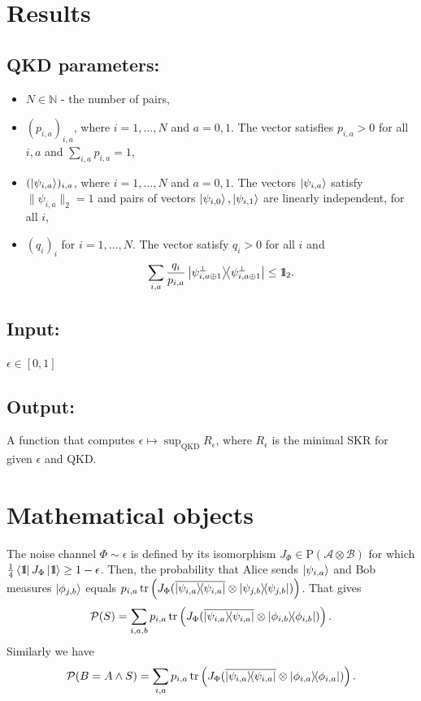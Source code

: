 \documentclass[12pt,a4paper,reqno, aps, superscriptaddress]{amsart}
\newcommand{\Id}{{\rm 1\hspace{-0.9mm}l}}
\newcommand{\PP}{\ensuremath{\mathcal{P}}}
\renewcommand{\AA}{\ensuremath{\mathcal{A}}}
\newcommand{\BB}{\ensuremath{\mathcal{B}}}
\newcommand{\proj}[1]{\ensuremath{\ketbra{#1}{#1}}}
\begin{document}
\section{Results}

\subsection{QKD parameters:}
\begin{itemize}
\item $N \in \mathbb{N}$ - the number of pairs,
\item $(p_{i,a})_{i,a}$, where $i=1,\ldots,N$ and $a=0,1$. The vector satisfies 
$p_{i,a} > 0$ for all $i,a$ and $\sum_{i,a} p_{i,a} = 1$,
\item $(\ket{\psi_{i,a}})_{i,a}$, where $i=1,\ldots,N$ and $a=0,1$. The vectors 
$\ket{\psi_{i,a}}$ satisfy $\|\psi_{i,a}\|_2=1$ and pairs of vectors 
$\ket{\psi_{i,0}}, \ket{\psi_{i,1}}$ 
are linearly independent, for all $i$,
\item $(q_i)_i$ for $i=1,\ldots,N$. The vector satisfy $q_i > 0$ for all $i$ 
and \begin{equation}
\sum_{i,a} 
\frac{q_i}{p_{i,a}} \proj{\psi_{i,a \oplus 1}^\perp} \le \Id_2.\end{equation}
\end{itemize}
\subsection{Input:}
$\epsilon \in [0,1]$
\subsection{Output:}
A function that computes $\epsilon \mapsto \sup_{\text{QKD}} R_\epsilon$, where 
$R_\epsilon$ is the minimal SKR for given $\epsilon$ and QKD.

\appendix
\section{Mathematical objects}
The noise channel $\Phi \sim \epsilon$ is defined by its isomorphism $J_\Phi 
\in \mathrm{P}(\AA \otimes \BB)$ 
for which $\frac14 \bra{\Id} J_\Phi \ket{\Id} \ge 1-\epsilon$. Then, the 
probability that Alice sends $\ket{\psi_{i,a}}$ and Bob measures 
$\ket{\phi_{j,b}}$ equals 
$p_{i,a} \tr\left(J_\Phi (\overline{\proj{\psi_{i,a}}} \otimes 
\proj{\psi_{j,b}})\right)$. 
That gives
\begin{equation}
\PP(S) = \sum_{i,a,b} p_{i,a} \tr\left(J_\Phi (\overline{\proj{\psi_{i,a}}} 
\otimes 
\proj{\phi_{i,b}})\right).
\end{equation}
Similarly we have
\begin{equation}
\PP(B=A \wedge S) = \sum_{i,a} p_{i,a} \tr\left(J_\Phi 
(\overline{\proj{\psi_{i,a}}} 
\otimes 
\proj{\phi_{i,a}})\right).
\end{equation}
\end{document}
